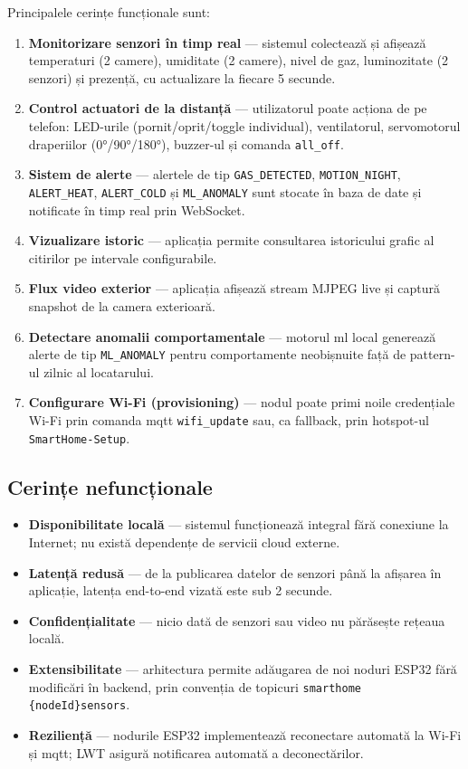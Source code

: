 Principalele cerințe funcționale sunt:

\begin{enumerate}
  \item \textbf{Monitorizare senzori în timp real} — sistemul colectează și afișează
    temperaturi (2 camere), umiditate (2 camere), nivel de gaz, luminozitate (2 senzori)
    și prezență, cu actualizare la fiecare 5 secunde.
  \item \textbf{Control actuatori de la distanță} — utilizatorul poate acționa de pe
    telefon: LED-urile (pornit/oprit/toggle individual), ventilatorul, servomotorul
    draperiilor (0°/90°/180°), buzzer-ul și comanda \texttt{all\_off}.
  \item \textbf{Sistem de alerte} — alertele de tip \texttt{GAS\_DETECTED},
    \texttt{MOTION\_NIGHT}, \texttt{ALERT\_HEAT}, \texttt{ALERT\_COLD} și
    \texttt{ML\_ANOMALY} sunt stocate în baza de date și notificate în timp real
    prin WebSocket.
  \item \textbf{Vizualizare istoric} — aplicația permite consultarea istoricului
    grafic al citirilor pe intervale configurabile.
  \item \textbf{Flux video exterior} — aplicația afișează stream MJPEG live și
    captură snapshot de la camera exterioară.
  \item \textbf{Detectare anomalii comportamentale} — motorul \gls{ml} local
    generează alerte de tip \texttt{ML\_ANOMALY} pentru comportamente neobișnuite
    față de pattern-ul zilnic al locatarului.
  \item \textbf{Configurare Wi-Fi (provisioning)} — nodul poate primi noile
    credențiale Wi-Fi prin comanda \gls{mqtt} \texttt{wifi\_update} sau, ca
    fallback, prin hotspot-ul \texttt{SmartHome-Setup}.
\end{enumerate}

\subsection{Cerințe nefuncționale}

\begin{itemize}
  \item \textbf{Disponibilitate locală} — sistemul funcționează integral fără
    conexiune la Internet; nu există dependențe de servicii cloud externe.
  \item \textbf{Latență redusă} — de la publicarea datelor de senzori până la
    afișarea în aplicație, latența end-to-end vizată este sub 2 secunde.
  \item \textbf{Confidențialitate} — nicio dată de senzori sau video nu
    părăsește rețeaua locală.
  \item \textbf{Extensibilitate} — arhitectura permite adăugarea de noi noduri
    ESP32 fără modificări în backend, prin convenția de topicuri
    \texttt{smarthome\slb{} \{nodeId\}\slb{}sensors}.
  \item \textbf{Reziliență} — nodurile ESP32 implementează reconectare automată
    la Wi-Fi și \gls{mqtt}; LWT asigură notificarea automată a deconectărilor.
\end{itemize}

